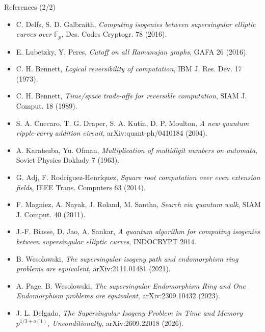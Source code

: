 \documentclass[aspectratio=169,10pt]{beamer}
\begin{document}
\begin{frame}{References (2/2)}
\scriptsize
\begin{itemize}\setlength{\itemsep}{1pt}
\item C. Delfs, S. D. Galbraith, \emph{Computing isogenies between supersingular elliptic curves over $\mathbb F_p$}, Des. Codes Cryptogr. 78 (2016).
\item E. Lubetzky, Y. Peres, \emph{Cutoff on all Ramanujan graphs}, GAFA 26 (2016).
\item C. H. Bennett, \emph{Logical reversibility of computation}, IBM J. Res. Dev. 17 (1973).
\item C. H. Bennett, \emph{Time/space trade-offs for reversible computation}, SIAM J. Comput. 18 (1989).
\item S. A. Cuccaro, T. G. Draper, S. A. Kutin, D. P. Moulton, \emph{A new quantum ripple-carry addition circuit}, arXiv:quant-ph/0410184 (2004).
\item A. Karatsuba, Yu. Ofman, \emph{Multiplication of multidigit numbers on automata}, Soviet Physics Doklady 7 (1963).
\item G. Adj, F. Rodr\'iguez-Henr\'iquez, \emph{Square root computation over even extension fields}, IEEE Trans. Computers 63 (2014).
\item F. Magniez, A. Nayak, J. Roland, M. Santha, \emph{Search via quantum walk}, SIAM J. Comput. 40 (2011).
\item J.-F. Biasse, D. Jao, A. Sankar, \emph{A quantum algorithm for computing isogenies between supersingular elliptic curves}, INDOCRYPT 2014.
\item B. Wesolowski, \emph{The supersingular isogeny path and endomorphism ring problems are equivalent}, arXiv:2111.01481 (2021).
\item A. Page, B. Wesolowski, \emph{The supersingular Endomorphism Ring and One Endomorphism problems are equivalent}, arXiv:2309.10432 (2023).
\item J. L. Delgado, \emph{The Supersingular Isogeny Problem in Time and Memory $p^{1/3+o(1)}$, Unconditionally}, arXiv:2609.22018 (2026).
\end{itemize}
\end{frame}
\end{document}
